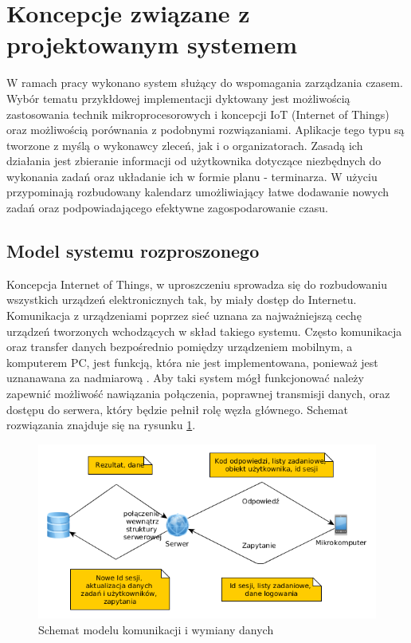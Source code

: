 \section{Koncepcje związane z projektowanym systemem}
\label{sec:Koncepcje związane z projektowanym systemem}

W ramach pracy wykonano system służący do wspomagania zarządzania czasem. Wybór tematu przykłdowej implementacji dyktowany jest możliwością zastosowania technik mikroprocesorowych i koncepcji IoT (Internet of Things) oraz możliwością porównania z podobnymi rozwiązaniami. Aplikacje tego typu są tworzone z myślą o wykonawcy zleceń, jak i o organizatorach. Zasadą ich działania jest zbieranie informacji od użytkownika dotyczące niezbędnych do wykonania zadań oraz układanie ich w formie planu - terminarza. W użyciu przypominają rozbudowany kalendarz umożliwiający łatwe dodawanie nowych zadań oraz podpowiadającego efektywne zagospodarowanie czasu.

\subsection{Model systemu rozproszonego}
\label{subs:Model systemu rozproszonego}

Koncepcja Internet of Things, w uproszczeniu sprowadza się do rozbudowaniu wszystkich urządzeń elektronicznych tak, by miały dostęp do Internetu. Komunikacja z urządzeniami poprzez sieć uznana za najważniejszą cechę urządzeń tworzonych wchodzących w skład takiego systemu. Często komunikacja oraz transfer danych bezpośrednio pomiędzy urządzeniem mobilnym, a komputerem PC, jest funkcją, która nie jest implementowana, ponieważ jest uznanawana za nadmiarową \cite{bib:iot-middleware}. Aby taki system mógł funkcjonować należy zapewnić możliwość nawiązania połączenia, poprawnej transmisji danych, oraz dostępu do serwera, który będzie pełnił rolę węzła głównego. Schemat rozwiązania znajduje się na rysunku \ref{figure:sys_synchro}.
\begin{figure}[ht]
  \centering
  \includegraphics[width=\textwidth]{images/synchro.png}
  \caption{Schemat modelu komunikacji i wymiany danych}
  \label{figure:sys_synchro}
\end{figure}
\FloatBarrier

